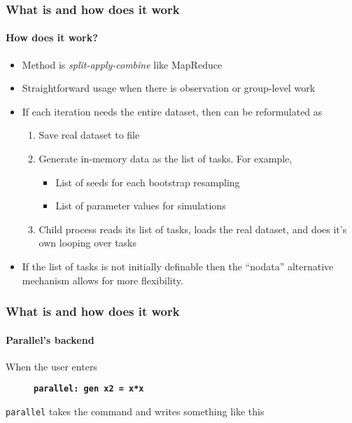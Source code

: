 \documentclass[9pt,\ExtraDocOpts]{beamer}
\begin{document}
\begin{frame} %
\frametitle{What is and how does it work}
\framesubtitle{How does it work?}

\begin{itemize}
\item Method is \textit{split-apply-combine} like MapReduce\pause{}
\item Straightforward usage when there is observation or group-level work\pause{}
\item If each iteration needs the entire dataset, then can be reformulated as\pause{}
\begin{enumerate}
\item Save real dataset to file\pause{}
\item Generate in-memory data as the list of tasks. For example,\pause{}
\begin{itemize}
\item List of seeds for each bootstrap resampling\pause{}
\item List of parameter values for simulations\pause{}
\end{itemize}
\item Child process reads its list of tasks, loads the real dataset, and does it's own looping over tasks\pause{}
\end{enumerate}
\item If the list of tasks is not initially definable then the ``nodata'' alternative mechanism allows for more flexibility.
\end{itemize}

\end{frame}


\begin{frame}
\frametitle{What is and how does it work}
\framesubtitle{Parallel's backend}

When the user enters 

\begin{figure}[fragile]
\small
\centering
{\bf{\tt parallel: gen x2 = x*x}}
\end{figure} 

{\tt parallel} takes the command and writes something like this\pause{}
\bigskip
\scriptsize


\end{frame}
\end{document}
